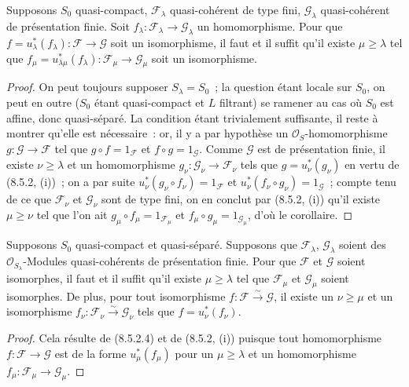 \begin{corollary}[8.5.2.4]
\label{IV.8.5.2.4-fr}
Supposons $S_0$ quasi-compact, $\mathcal F_\lambda$ quasi-cohérent de type fini,
$\mathcal G_\lambda$ quasi-cohérent de présentation finie. Soit
$f_\lambda:\mathcal F_\lambda\to\mathcal G_\lambda$ un homomorphisme. Pour que
$f=u_\lambda^*(f_\lambda):\mathcal F\to\mathcal G$ soit un isomorphisme, il faut
et il suffit qu'il existe $\mu\geq\lambda$ tel que
$f_\mu=u_{\lambda\mu}^*(f_\lambda):\mathcal F_\mu\to\mathcal G_\mu$ soit un
isomorphisme.
\end{corollary}

\begin{proof}
On peut toujours supposer $S_\lambda=S_0$~; la question étant locale sur $S_0$,
on peut en outre ($S_0$ étant quasi-compact et $L$ filtrant) se ramener au cas
où $S_0$ est affine, donc quasi-séparé. La condition étant trivialement
suffisante, il reste à montrer qu'elle est nécessaire~: or, il y a par
hypothèse un $\mathcal O_S$-homomorphisme $g:\mathcal G\to\mathcal F$ tel que
$g\circ f=1_{\mathcal F}$ et $f\circ g=1_{\mathcal G}$. Comme $\mathcal G$ est
de présentation finie, il existe $\nu\geq\lambda$ et un homomorphisme
$g_\nu:\mathcal G_\nu\to\mathcal F_\nu$ tels que $g=u_\nu^*(g_\nu)$ en vertu de
(8.5.2, (i))~; on a par suite
$u_\nu^*(g_\nu\circ f_\nu)=1_{\mathcal F}$
et $u_\nu^*(f_\nu\circ g_\nu)=1_{\mathcal G}$~; compte tenu de ce que
$\mathcal F_\nu$ et $\mathcal G_\nu$ sont de type fini, on en conclut par
(8.5.2, (i)) qu'il existe $\mu\geq\nu$ tel que l'on ait
$g_\mu\circ f_\mu=1_{\mathcal F_\mu}$ et
$f_\mu\circ g_\mu=1_{\mathcal G_\mu}$, d'où le corollaire.
\end{proof}

\begin{corollary}[8.5.2.5]
\label{IV.8.5.2.5-fr}
Supposons $S_0$ quasi-compact et quasi-séparé. Supposons que
$\mathcal F_\lambda$, $\mathcal G_\lambda$ soient des
$\mathcal O_{S_\lambda}$-Modules quasi-cohérents de présentation finie. Pour
que $\mathcal F$ et $\mathcal G$ soient isomorphes, il faut et il suffit qu'il
existe $\mu\geq\lambda$ tel que $\mathcal F_\mu$ et $\mathcal G_\mu$ soient
isomorphes. De plus, pour tout isomorphisme
$f:\mathcal F\xrightarrow{\sim}\mathcal G$, il existe un $\nu\geq\mu$ et un
isomorphisme $f_\nu:\mathcal F_\nu\xrightarrow{\sim}\mathcal G_\nu$ tels que
$f=u_\nu^*(f_\nu)$.
\end{corollary}

\begin{proof}
Cela résulte de (8.5.2.4) et de (8.5.2, (i)) puisque tout homomorphisme
$f:\mathcal F\to\mathcal G$ est de la forme $u_\mu^*(f_\mu)$ pour un
$\mu\geq\lambda$ et un homomorphisme
$f_\mu:\mathcal F_\mu\to\mathcal G_\mu$.
\end{proof}

